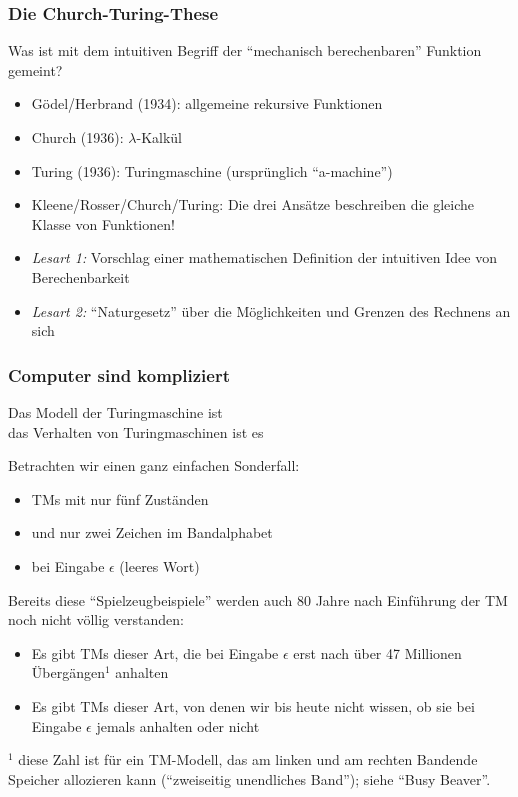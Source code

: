 \documentclass[aspectratio=1610,onlymath]{beamer}
\begin{document}
\begin{frame}\frametitle{Die Church-Turing-These}

Was ist mit dem intuitiven Begriff der "`mechanisch berechenbaren"' Funktion gemeint?\pause
% 
\begin{itemize}
\item \alert{Gödel/Herbrand (1934):} allgemeine rekursive Funktionen
\item \alert{Church (1936):} $\lambda$-Kalkül
\item \alert{Turing (1936):} Turingmaschine (ursprünglich "`a-machine"')\pause
\item \alert{Kleene/Rosser/Church/Turing:} Die drei Ansätze beschreiben die gleiche Klasse von Funktionen!
\end{itemize}

\pause

\begin{itemize}
\item \emph{Lesart 1:} Vorschlag einer mathematischen Definition der intuitiven Idee von Berechenbarkeit
\item \emph{Lesart 2:} "`Naturgesetz"' über die Möglichkeiten und Grenzen des Rechnens an sich
\end{itemize}

\end{frame}

\begin{frame}\frametitle{Computer sind kompliziert}

Das Modell der Turingmaschine ist \\
das Verhalten von Turingmaschinen ist es \bigskip

Betrachten wir einen ganz einfachen Sonderfall:
\begin{itemize}
\item TMs mit nur \alert{fünf Zuständen}
\item und nur \alert{zwei Zeichen} im Bandalphabet
\item bei \alert{Eingabe $\epsilon$} (leeres Wort)
\end{itemize}\pause\bigskip

Bereits diese "`Spielzeugbeispiele"' werden auch 80 Jahre nach Einführung der TM noch nicht völlig verstanden:
\begin{itemize}
\item Es gibt TMs dieser Art, die bei Eingabe $\epsilon$ erst nach über 47 Millionen Übergängen${}^1$ anhalten
\item Es gibt TMs dieser Art, von denen wir bis heute nicht wissen, ob sie bei Eingabe $\epsilon$ jemals anhalten oder nicht
\end{itemize}

{\tiny ${}^1$ diese Zahl ist für ein TM-Modell, das am linken und am rechten Bandende Speicher allozieren kann ("`zweiseitig unendliches Band"'); siehe "`Busy Beaver"'.

}

\end{frame}
\end{document}

